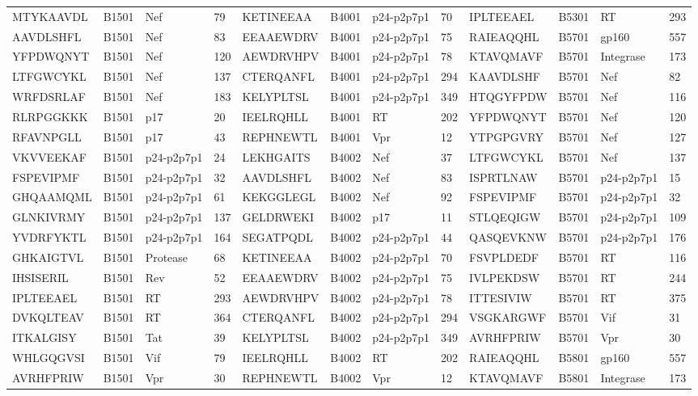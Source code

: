 \begin{table}[htp]
\begin{center}
\begin{sideways}
{\begin{tabulary}{1.5\textwidth}{|l|l|l|l|l|l|l|l|l|l|l|l|}
MTYKAAVDL & B1501 & Nef & 79 & KETINEEAA & B4001 & p24-p2p7p1 & 70 & IPLTEEAEL & B5301 & RT & 293 \\
AAVDLSHFL & B1501 & Nef & 83 & EEAAEWDRV & B4001 & p24-p2p7p1 & 75 & RAIEAQQHL & B5701 & gp160 & 557 \\
YFPDWQNYT & B1501 & Nef & 120 & AEWDRVHPV & B4001 & p24-p2p7p1 & 78 & KTAVQMAVF & B5701 & Integrase & 173 \\
LTFGWCYKL & B1501 & Nef & 137 & CTERQANFL & B4001 & p24-p2p7p1 & 294 & KAAVDLSHF & B5701 & Nef & 82 \\
WRFDSRLAF & B1501 & Nef & 183 & KELYPLTSL & B4001 & p24-p2p7p1 & 349 & HTQGYFPDW & B5701 & Nef & 116 \\
RLRPGGKKK & B1501 & p17 & 20 & IEELRQHLL & B4001 & RT & 202 & YFPDWQNYT & B5701 & Nef & 120 \\
RFAVNPGLL & B1501 & p17 & 43 & REPHNEWTL & B4001 & Vpr & 12 & YTPGPGVRY & B5701 & Nef & 127 \\
VKVVEEKAF & B1501 & p24-p2p7p1 & 24 & LEKHGAITS & B4002 & Nef & 37 & LTFGWCYKL & B5701 & Nef & 137 \\
FSPEVIPMF & B1501 & p24-p2p7p1 & 32 & AAVDLSHFL & B4002 & Nef & 83 & ISPRTLNAW & B5701 & p24-p2p7p1 & 15 \\
GHQAAMQML & B1501 & p24-p2p7p1 & 61 & KEKGGLEGL & B4002 & Nef & 92 & FSPEVIPMF & B5701 & p24-p2p7p1 & 32 \\
GLNKIVRMY & B1501 & p24-p2p7p1 & 137 & GELDRWEKI & B4002 & p17 & 11 & STLQEQIGW & B5701 & p24-p2p7p1 & 109 \\
YVDRFYKTL & B1501 & p24-p2p7p1 & 164 & SEGATPQDL & B4002 & p24-p2p7p1 & 44 & QASQEVKNW & B5701 & p24-p2p7p1 & 176 \\
GHKAIGTVL & B1501 & Protease & 68 & KETINEEAA & B4002 & p24-p2p7p1 & 70 & FSVPLDEDF & B5701 & RT & 116 \\
IHSISERIL & B1501 & Rev & 52 & EEAAEWDRV & B4002 & p24-p2p7p1 & 75 & IVLPEKDSW & B5701 & RT & 244 \\
IPLTEEAEL & B1501 & RT & 293 & AEWDRVHPV & B4002 & p24-p2p7p1 & 78 & ITTESIVIW & B5701 & RT & 375 \\
DVKQLTEAV & B1501 & RT & 364 & CTERQANFL & B4002 & p24-p2p7p1 & 294 & VSGKARGWF & B5701 & Vif & 31 \\
ITKALGISY & B1501 & Tat & 39 & KELYPLTSL & B4002 & p24-p2p7p1 & 349 & AVRHFPRIW & B5701 & Vpr & 30 \\
WHLGQGVSI & B1501 & Vif & 79 & IEELRQHLL & B4002 & RT & 202 & RAIEAQQHL & B5801 & gp160 & 557 \\
AVRHFPRIW & B1501 & Vpr & 30 & REPHNEWTL & B4002 & Vpr & 12 & KTAVQMAVF & B5801 & Integrase & 173 \\

\end{tabulary}}
\end{sideways}
\end{center}
\end{table}
